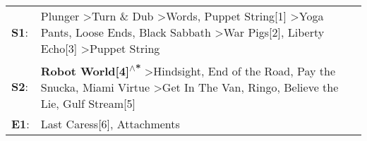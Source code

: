 \begin{supertabular}{p{0.03\textwidth}p{0.92\textwidth}}
 \textbf{S1}:  &  Plunger\textsuperscript{} \textgreater \enspace Turn \& Dub\textsuperscript{} \textgreater \enspace Words\textsuperscript{}, \enspace Puppet String[1]\textsuperscript{} \textgreater \enspace Yoga Pants\textsuperscript{}, \enspace Loose Ends\textsuperscript{}, \enspace Black Sabbath\textsuperscript{} \textgreater \enspace War Pigs[2]\textsuperscript{}, \enspace Liberty Echo[3]\textsuperscript{} \textgreater \enspace Puppet String\textsuperscript{}  \enspace  \\
 \textbf{S2}:  &                                                \textbf{Robot World[4]\textsuperscript{$\wedge$*}} \textgreater \enspace Hindsight\textsuperscript{}, \enspace End of the Road\textsuperscript{}, \enspace Pay the Snucka\textsuperscript{}, \enspace Miami Virtue\textsuperscript{} \textgreater \enspace Get In The Van\textsuperscript{}, \enspace Ringo\textsuperscript{}, \enspace Believe the Lie\textsuperscript{}, \enspace Gulf Stream[5]\textsuperscript{}  \enspace  \\
 \textbf{E1}:  &                                                                                                                                                                                                                                                                                                                                                                                            Last Caress[6]\textsuperscript{}, \enspace Attachments\textsuperscript{}  \enspace  \\
\end{supertabular}
